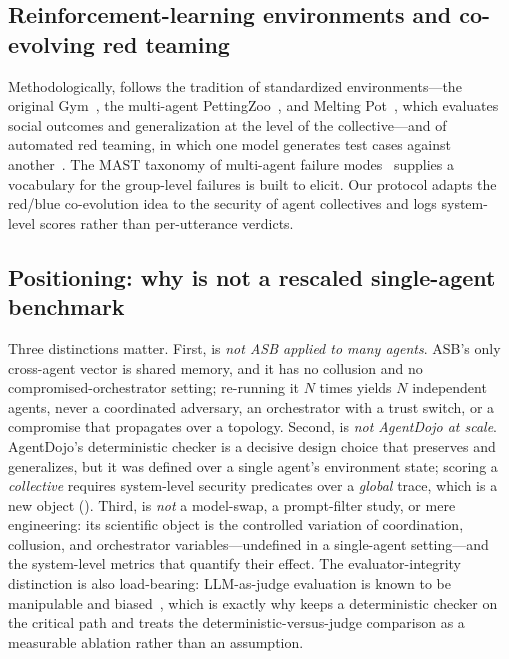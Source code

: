 \subsection{Reinforcement-learning environments and co-evolving red teaming}
Methodologically,  follows the tradition of standardized environments---the
original Gym~\cite{brockman2016openaigym}, the multi-agent PettingZoo~\cite{terry2021pettingzoo},
and Melting Pot~\cite{leibo2021meltingpot}, which evaluates social outcomes and
generalization at the level of the collective---and of automated red teaming, in which
one model generates test cases against another~\cite{perez2022redteaming}. The MAST
taxonomy of multi-agent failure modes~\cite{cemri2025mast} supplies a vocabulary for
the group-level failures  is built to elicit. Our \corb{} protocol adapts the
red/blue co-evolution idea to the security of agent collectives and logs system-level
scores rather than per-utterance verdicts.

\subsection{Positioning: why  is not a rescaled single-agent benchmark}
\label{sec:positioning}
Three distinctions matter. First,  is \emph{not ASB applied to many agents}.
ASB's only cross-agent vector is shared memory, and it has no collusion and no
compromised-orchestrator setting; re-running it $N$ times yields $N$ independent agents,
never a coordinated adversary, an orchestrator with a trust switch, or a compromise that
propagates over a topology. Second,  is \emph{not AgentDojo at scale}.
AgentDojo's deterministic checker is a decisive design choice that  preserves
and generalizes, but it was defined over a single agent's environment state; scoring a
\emph{collective} requires system-level security predicates over a \emph{global} trace,
which is a new object (). Third,  is \emph{not} a model-swap,
a prompt-filter study, or mere engineering: its scientific object is the controlled
variation of coordination, collusion, and orchestrator variables---undefined in a
single-agent setting---and the system-level metrics that quantify their effect. The
evaluator-integrity distinction is also load-bearing: LLM-as-judge evaluation is known
to be manipulable and biased~\cite{zheng2023judging,wang2023fair}, which is exactly why
 keeps a deterministic checker on the critical path and treats the
deterministic-versus-judge comparison as a measurable ablation rather than an assumption.

